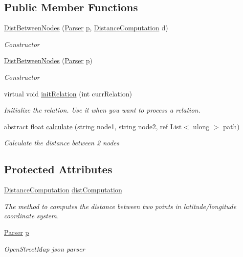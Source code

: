 \subsection*{Public Member Functions}
\begin{DoxyCompactItemize}
\item 
\hyperlink{classDistBetweenNodes_a1d84c0560c209da4cd0612ba8b198a71}{Dist\+Between\+Nodes} (\hyperlink{classParser}{Parser} \hyperlink{classDistBetweenNodes_a2a87914cc1b9e98fa17635950df55bd9}{p}, \hyperlink{classDistanceComputation}{Distance\+Computation} d)
\begin{DoxyCompactList}\small\item\em Constructor \end{DoxyCompactList}\item 
\hyperlink{classDistBetweenNodes_a69841af034ea9d970333603afa458049}{Dist\+Between\+Nodes} (\hyperlink{classParser}{Parser} \hyperlink{classDistBetweenNodes_a2a87914cc1b9e98fa17635950df55bd9}{p})
\begin{DoxyCompactList}\small\item\em Constructor \end{DoxyCompactList}\item 
virtual void \hyperlink{classDistBetweenNodes_a6a05019d7ec4797028e5e11611ff96d4}{init\+Relation} (int curr\+Relation)
\begin{DoxyCompactList}\small\item\em Initialize the relation. Use it when you want to process a relation. \end{DoxyCompactList}\item 
abstract float \hyperlink{classDistBetweenNodes_a2e27c4f9d851343d2d96e53864a841b7}{calculate} (string node1, string node2, ref List$<$ ulong $>$ path)
\begin{DoxyCompactList}\small\item\em Calculate the distance between 2 nodes \end{DoxyCompactList}\end{DoxyCompactItemize}
\subsection*{Protected Attributes}
\begin{DoxyCompactItemize}
\item 
\hyperlink{classDistanceComputation}{Distance\+Computation} \hyperlink{classDistBetweenNodes_a6b95035e7b7985c3b0e9923407d6c149}{dist\+Computation}
\begin{DoxyCompactList}\small\item\em The method to computes the distance between two points in latitude/longitude coordinate system.\end{DoxyCompactList}\item 
\hyperlink{classParser}{Parser} \hyperlink{classDistBetweenNodes_a2a87914cc1b9e98fa17635950df55bd9}{p}
\begin{DoxyCompactList}\small\item\em Open\+Street\+Map json parser\end{DoxyCompactList}\end{DoxyCompactItemize}


